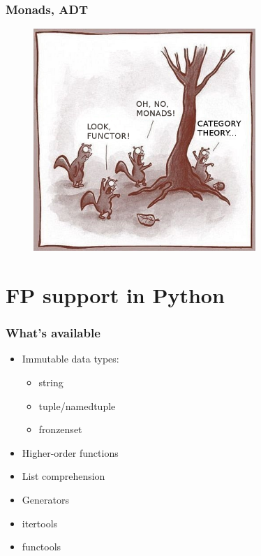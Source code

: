 \documentclass[18pt, compress]{beamer}
\begin{document}
\begin{frame}
    \frametitle{Monads, ADT}
    \vspace{-25pt}
    \begin{figure}
        \includegraphics[width=0.75\textwidth,center]{squirells.png}
    \end{figure}
\end{frame}

\fontsize{13pt}{14}\selectfont
\section{FP support in Python}
\fontsize{17pt}{18}\selectfont

\begin{frame}
    \frametitle{What's available}
    \vspace{-25pt}
    \begin{itemize}[label={\MVRightarrow}]
        \item <+->Immutable data types:
            \begin{itemize}
                \item string
                \item tuple/namedtuple
                \item fronzenset
            \end{itemize}
        \item <+->Higher-order functions
        \item <+->List comprehension
        \item <+->Generators
        \item <+->itertools
        \item <+->functools
    \end{itemize}
\end{frame}
\end{document}
